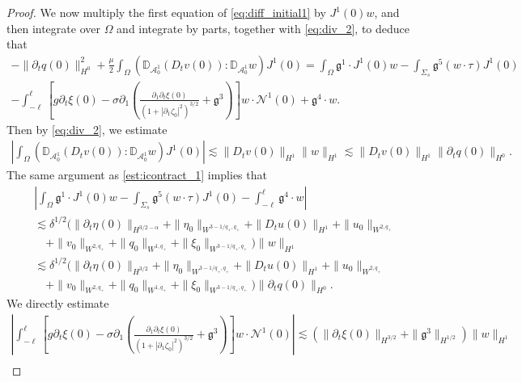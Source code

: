 \documentclass[letterpaper,reqno,10pt,twoside]{amsart}
\theoremstyle{definition}
\theoremstyle{remark}
\def\p{\partial}
\def\Om{\Omega}
\begin{document}
\begin{appendix}
\begin{proof}
				We now multiply the first equation of \eqref{eq:diff_initial1} by $J^1(0)w$, and then integrate over $\Om$ and integrate by parts, together with \eqref{eq:div_2}, to deduce that
				\begin{equation}\label{eq:contract_dtq}
					\begin{aligned}
						-\|\p_tq(0)\|_{H^0}^2+\frac\mu2\int_\Om(\mathbb{D}_{\mathcal{A}_0^1}(D_tv(0)):\mathbb{D}_{\mathcal{A}_0^1}w)J^1(0)=\int_\Om \mathfrak{g}^1\cdot J^1(0)w-\int_{\Sigma_s}\mathfrak{g}^5(w\cdot\tau)J^1(0)\\
						-\int_{-\ell}^\ell \left[g\p_t\xi(0)-\sigma\p_1\left(\frac{\p_1\p_t\xi(0)}{(1+|\p_1\zeta_0|^2)^{3/2}}+\mathfrak{g}^3\right)\right]w\cdot\mathcal{N}^1(0)+\mathfrak{g}^4\cdot w.
					\end{aligned}
				\end{equation}
				Then by \eqref{eq:div_2}, we estimate
				\begin{equation}\label{est:icontract_2}
					\begin{aligned}
						|\int_\Om(\mathbb{D}_{\mathcal{A}_0^1}(D_tv(0)):\mathbb{D}_{\mathcal{A}_0^1}w)J^1(0)|\lesssim \|D_tv(0)\|_{H^1}\|w\|_{H^1}\lesssim\|D_tv(0)\|_{H^1}\|\p_tq(0)\|_{H^0}.
					\end{aligned}
				\end{equation}
				The same argument as \eqref{est:icontract_1} implies that
				\begin{equation}
					\begin{aligned}
						&|\int_\Om \mathfrak{g}^1\cdot J^1(0)w-\int_{\Sigma_s}\mathfrak{g}^5(w\cdot\tau)J^1(0)-\int_{-\ell}^\ell \mathfrak{g}^4\cdot w|\\
						&\lesssim \delta^{1/2}(\|\p_t\eta(0)\|_{H^{3/2-\alpha}}+\|\eta_0\|_{W^{3-1/q_+,q_+}}+\|D_tu(0)\|_{H^1}+\|u_0\|_{W^{2,q_+}}\\
						&\quad+\|v_0\|_{W^{2,q_+}}+\|q_0\|_{W^{1,q_+}}+\|\xi_0\|_{W^{3-1/q_+,q_+}})\|w\|_{H^1}\\
						&\lesssim\delta^{1/2}(\|\p_t\eta(0)\|_{H^{3/2}}+\|\eta_0\|_{W^{3-1/q_+,q_+}}+\|D_tu(0)\|_{H^1}+\|u_0\|_{W^{2,q_+}}\\
						&\quad+\|v_0\|_{W^{2,q_+}}+\|q_0\|_{W^{1,q_+}}+\|\xi_0\|_{W^{3-1/q_+,q_+}})\|\p_tq(0)\|_{H^0}.
					\end{aligned}
				\end{equation}
				We directly estimate
				\begin{equation}\label{est:icontract_3}
					\begin{aligned}
						|\int_{-\ell}^\ell \left[g\p_t\xi(0)-\sigma\p_1\left(\frac{\p_1\p_t\xi(0)}{(1+|\p_1\zeta_0|^2)^{3/2}}+\mathfrak{g}^3\right)\right]w\cdot\mathcal{N}^1(0)|\lesssim (\|\p_t\xi(0)\|_{H^{3/2}}+\|\mathfrak{g}^3\|_{H^{1/2}})\|w\|_{H^1}\\

\end{aligned}
\end{equation}
\end{proof}
\end{appendix}
\end{document}

